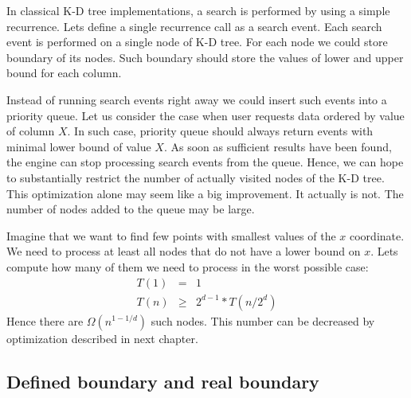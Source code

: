 \documentclass[10pt,a4paper]{article}
\begin{document}
In classical K-D tree implementations, a search is performed by using a simple recurrence. Lets define a single recurrence call as a search event. Each search event is performed on a single node of K-D tree. For each node we could store boundary of its nodes. Such boundary should store the values of lower and upper bound for each column.

Instead of running search events right away we could insert such events into a priority queue. Let us consider the case when user requests data ordered by value of column $X$. In such case, priority queue should always return events with minimal lower bound of value $X$. As soon as sufficient results have been found, the engine can stop processing search events from the queue. Hence, we can hope to substantially restrict the number of actually visited nodes of the K-D tree. This optimization alone may seem like a big improvement. It actually is not. The number of nodes added to the queue may be large.

Imagine that we want to find few points with smallest values of the $x$ coordinate. We need to process at least all nodes
that do not have a lower bound on $x$. Lets compute how many of them we need to process in the worst possible case:
\begin{eqnarray*}
T(1) &=& 1\\
T(n) &\geq& 2^{d-1} * T(n/2^{d})
\end{eqnarray*}
Hence there are $\Omega (n^{1-1/d})$ such nodes. This number can be decreased by optimization described in next chapter.

\subsection{Defined boundary and real boundary}
\end{document}
